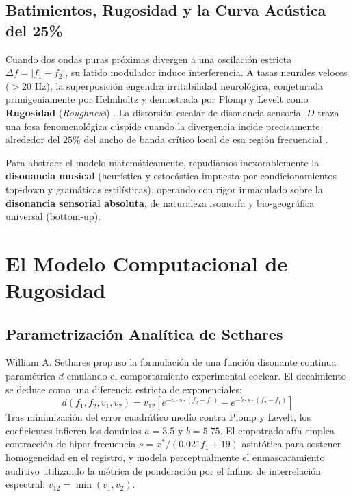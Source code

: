 \subsection{Batimientos, Rugosidad y la Curva Acústica del 25\%}
Cuando dos ondas puras próximas divergen a una oscilación estricta $\Delta f = |f_1 - f_2|$, su latido modulador induce interferencia. A tasas neurales veloces ($>20$ Hz), la superposición engendra irritabilidad neurológica, conjeturada primigeniamente por Helmholtz y demostrada por Plomp y Levelt como \textbf{Rugosidad} (\textit{Roughness}) \cite{plomp1965tonal}. La distorsión escalar de disonancia sensorial $D$ traza una fosa fenomenológica cúspide cuando la divergencia incide precisamente alrededor del $25\%$ del ancho de banda crítico local de esa región frecuencial \cite{Sethares2005}.

Para abstraer el modelo matemáticamente, repudiamos inexorablemente la \textbf{disonancia musical} (heurística y estocástica impuesta por condicionamientos top-down y gramáticas estilísticas), operando con rigor inmaculado sobre la \textbf{disonancia sensorial absoluta}, de naturaleza isomorfa y bio-geográfica universal (bottom-up).

\section{El Modelo Computacional de Rugosidad}
\label{sec:modelo_computacional_rugosidad}

\subsection{Parametrización Analítica de Sethares}
William A. Sethares propuso la formulación de una función disonante continua paramétrica $d$ emulando el comportamiento experimental coclear. El decaimiento se deduce como una diferencia estricta de exponenciales:
\begin{equation}
    d(f_1, f_2, v_1, v_2) = v_{12} \left[ e^{-a \cdot s \cdot (f_2 - f_1)} - e^{-b \cdot s \cdot (f_2 - f_1)} \right]
\end{equation}
Tras minimización del error cuadrático medio contra Plomp y Levelt, los coeficientes infieren los dominios $a=3.5$ y $b=5.75$. El empotrado afín emplea contracción de hiper-frecuencia $s = x^* / (0.021f_1 + 19)$ asintótica para sostener homogeneidad en el registro, y modela perceptualmente el enmascaramiento auditivo utilizando la métrica de ponderación por el ínfimo de interrelación espectral: $v_{12} = \min(v_1, v_2)$.

